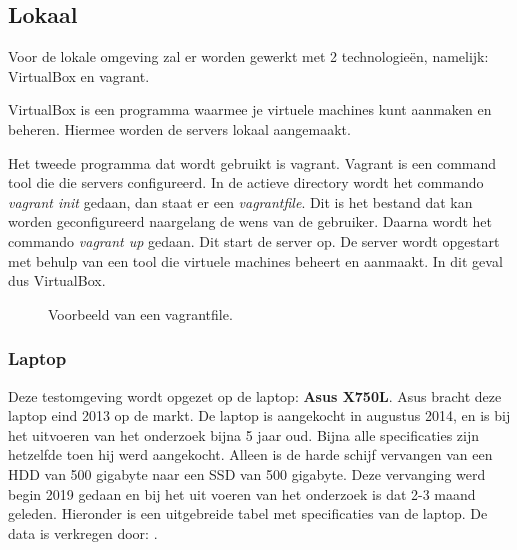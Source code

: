 \subsection{Lokaal}
Voor de lokale omgeving zal er worden gewerkt met 2 technologieën, namelijk: VirtualBox en vagrant. 

VirtualBox is een programma waarmee je virtuele machines kunt aanmaken en beheren. Hiermee worden de servers lokaal aangemaakt. 

Het tweede programma dat wordt gebruikt is vagrant. Vagrant is een command tool die die servers configureerd. In de actieve directory wordt het commando \textit{vagrant init} gedaan, dan staat er een \textit{vagrantfile}. Dit is het bestand dat kan worden geconfigureerd naargelang de wens van de gebruiker. Daarna wordt het commando \textit{vagrant up} gedaan. Dit start de server op. De server wordt opgestart met behulp van een tool die virtuele machines beheert en aanmaakt. In dit geval dus VirtualBox.
\begin{figure}[!htb]
	\caption{Voorbeeld van een vagrantfile.}
	\label{fig:vagrantexamp}
\end{figure}

\newpage
\subsubsection{Laptop}
Deze testomgeving wordt opgezet op de laptop: \textbf{Asus X750L}. Asus bracht deze laptop eind 2013 op de markt. De laptop is aangekocht in augustus 2014, en is bij het uitvoeren van het onderzoek bijna 5 jaar oud. Bijna alle specificaties zijn hetzelfde toen hij werd aangekocht. Alleen is de harde schijf vervangen van een HDD van 500 gigabyte naar een SSD van 500 gigabyte. Deze vervanging werd begin 2019 gedaan en bij het uit voeren van het onderzoek is dat 2-3 maand geleden. Hieronder is een  uitgebreide tabel met specificaties van de laptop. De data is verkregen door: \autocite{asuslaptop}.

